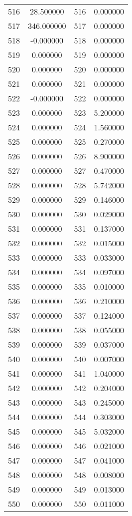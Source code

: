 \documentclass[12pt]{article}
\begin{document}
\begin{longtable}{@{}cccc@{}}
516 & 28.500000 & 516 & 0.000000 \\
517 & 346.000000 & 517 & 0.000000 \\
518 & -0.000000 & 518 & 0.000000 \\
519 & 0.000000 & 519 & 0.000000 \\
520 & 0.000000 & 520 & 0.000000 \\
521 & 0.000000 & 521 & 0.000000 \\
522 & -0.000000 & 522 & 0.000000 \\
523 & 0.000000 & 523 & 5.200000 \\
524 & 0.000000 & 524 & 1.560000 \\
525 & 0.000000 & 525 & 0.270000 \\
526 & 0.000000 & 526 & 8.900000 \\
527 & 0.000000 & 527 & 0.470000 \\
528 & 0.000000 & 528 & 5.742000 \\
529 & 0.000000 & 529 & 0.146000 \\
530 & 0.000000 & 530 & 0.029000 \\
531 & 0.000000 & 531 & 0.137000 \\
532 & 0.000000 & 532 & 0.015000 \\
533 & 0.000000 & 533 & 0.033000 \\
534 & 0.000000 & 534 & 0.097000 \\
535 & 0.000000 & 535 & 0.010000 \\
536 & 0.000000 & 536 & 0.210000 \\
537 & 0.000000 & 537 & 0.124000 \\
538 & 0.000000 & 538 & 0.055000 \\
539 & 0.000000 & 539 & 0.037000 \\
540 & 0.000000 & 540 & 0.007000 \\
541 & 0.000000 & 541 & 1.040000 \\
542 & 0.000000 & 542 & 0.204000 \\
543 & 0.000000 & 543 & 0.245000 \\
544 & 0.000000 & 544 & 0.303000 \\
545 & 0.000000 & 545 & 5.032000 \\
546 & 0.000000 & 546 & 0.021000 \\
547 & 0.000000 & 547 & 0.041000 \\
548 & 0.000000 & 548 & 0.008000 \\
549 & 0.000000 & 549 & 0.013000 \\
550 & 0.000000 & 550 & 0.011000 \\

\end{longtable}
\end{document}
